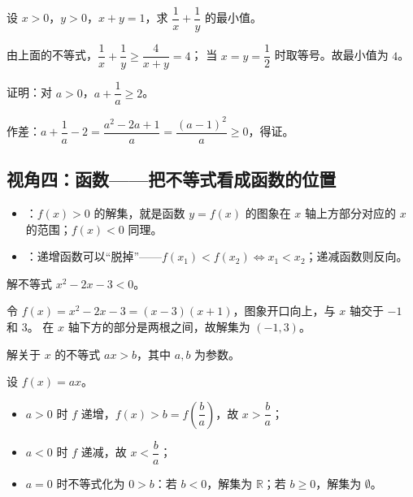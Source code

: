 \begin{explore}
\begin{problem}
设 $x>0$，$y>0$，$x+y=1$，求 $\dfrac1x+\dfrac1y$ 的最小值。
\end{problem}
\begin{solution}
由上面的不等式，$\dfrac1x+\dfrac1y\geq\dfrac{4}{x+y}=4$；
当 $x=y=\dfrac12$ 时取等号。故最小值为 $4$。
\end{solution}

\begin{problem}
证明：对 $a>0$，$a+\dfrac1a\geq2$。
\end{problem}
\begin{solution}
作差：$a+\dfrac1a-2=\dfrac{a^2-2a+1}{a}=\dfrac{(a-1)^2}{a}\geq0$，得证。
\end{solution}

\subsection{视角四：函数——把不等式看成函数的位置}

\begin{itemize}
  \item {}：$f(x)>0$ 的解集，就是函数 $y=f(x)$ 的图象在 $x$ 轴上方部分对应的 $x$ 的范围；$f(x)<0$ 同理。
  \item {}：递增函数可以“脱掉”——$f(x_1)<f(x_2)\iff x_1<x_2$；递减函数则反向。
\end{itemize}

\begin{example}
解不等式 $x^2-2x-3<0$。
\end{example}
\begin{solution}
令 $f(x)=x^2-2x-3=(x-3)(x+1)$，图象开口向上，与 $x$ 轴交于 $-1$ 和 $3$。
在 $x$ 轴下方的部分是两根之间，故解集为 $(-1,3)$。
\end{solution}

\begin{example}
解关于 $x$ 的不等式 $ax>b$，其中 $a,b$ 为参数。
\end{example}
\begin{solution}
设 $f(x)=ax$。
\begin{itemize}
  \item $a>0$ 时 $f$ 递增，$f(x)>b=f\left(\dfrac{b}{a}\right)$，故 $x>\dfrac{b}{a}$；
  \item $a<0$ 时 $f$ 递减，故 $x<\dfrac{b}{a}$；
  \item $a=0$ 时不等式化为 $0>b$：若 $b<0$，解集为 $\mathbb{R}$；若 $b\geq0$，解集为 $\emptyset$。
\end{itemize}
\end{solution}


\end{explore}
